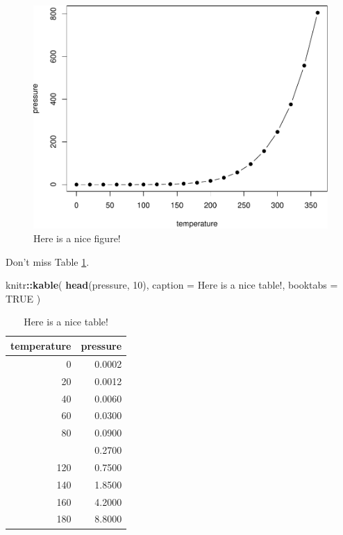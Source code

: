 \documentclass[
]{book}
\newenvironment{Shaded}{\begin{snugshade}}{\end{snugshade}}
\newcommand{\AttributeTok}[1]{\textcolor[rgb]{0.13,0.29,0.53}{#1}}
\newcommand{\ConstantTok}[1]{\textcolor[rgb]{0.56,0.35,0.01}{#1}}
\newcommand{\DecValTok}[1]{\textcolor[rgb]{0.00,0.00,0.81}{#1}}
\newcommand{\FunctionTok}[1]{\textcolor[rgb]{0.13,0.29,0.53}{\textbf{#1}}}
\newcommand{\NormalTok}[1]{#1}
\newcommand{\SpecialCharTok}[1]{\textcolor[rgb]{0.81,0.36,0.00}{\textbf{#1}}}
\newcommand{\StringTok}[1]{\textcolor[rgb]{0.31,0.60,0.02}{#1}}
\theoremstyle{definition}
\theoremstyle{definition}
\theoremstyle{definition}
\theoremstyle{definition}
\theoremstyle{remark}
\begin{document}
\begin{figure}

{\centering \includegraphics[width=0.8\linewidth]{_main_files/figure-latex/nice-fig-1} 

}

\caption{Here is a nice figure!}\label{fig:nice-fig}
\end{figure}

Don't miss Table \ref{tab:nice-tab}.

\begin{Shaded}
\begin{Highlighting}[]
\NormalTok{knitr}\SpecialCharTok{::}\FunctionTok{kable}\NormalTok{(}
  \FunctionTok{head}\NormalTok{(pressure, }\DecValTok{10}\NormalTok{), }\AttributeTok{caption =} \StringTok{\textquotesingle{}Here is a nice table!\textquotesingle{}}\NormalTok{,}
  \AttributeTok{booktabs =} \ConstantTok{TRUE}
\NormalTok{)}
\end{Highlighting}
\end{Shaded}

\begin{table}

\caption{\label{tab:nice-tab}Here is a nice table!}
\centering
\begin{tabular}[t]{rr}
\toprule
temperature & pressure\\
\midrule
0 & 0.0002\\
20 & 0.0012\\
40 & 0.0060\\
60 & 0.0300\\
80 & 0.0900\\
\addlinespace
100 & 0.2700\\
120 & 0.7500\\
140 & 1.8500\\
160 & 4.2000\\
180 & 8.8000\\
\bottomrule
\end{tabular}
\end{table}
\end{document}
